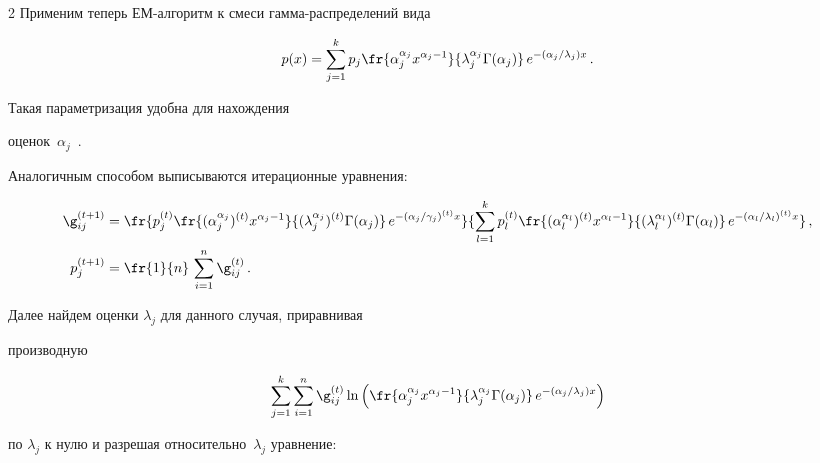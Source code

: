 \begin{multicols}{2}
Применим теперь ЕМ-алгоритм к смеси гам\-ма-рас\-пре\-де\-ле\-ний вида


$$


p(x) = \sum\limits_{j=1}^k p_j \fr{\alpha_j^{\alpha_j} x^{\alpha_j -


1}}{\lambda_j^{\alpha_j} \Gamma (\alpha_j )}\,e^{-(\alpha_j / \lambda_j)x}\,.


$$





Такая параметризация удобна для нахождения


оценок~$\alpha_j$~\cite{6bat}.





Аналогичным способом выписываются итерационные уравнения:


\begin{align*}


\g_{ij}^{(t+1)} & =   \fr{p_j^{(t)}\fr{(\alpha_j^{\alpha_j} )^{(t)}


x^{\alpha_j - 1}}{(\lambda_j^{\alpha_j} )^{(t)}\Gamma (\alpha_j)}\,


e^{-(\alpha_j /\gamma_j)^{(t)}x}}{\sum\limits_{l=1}^k


p_l^{(t)}\fr{(\alpha_l^{\alpha_l})^{(t)} x^{\alpha_l -


1}}{(\lambda_l^{\alpha_l})^{(t)}\Gamma (\alpha_l )}\,


e^{-(\alpha_l /\lambda_l)^{(t)} x}}\,,\\


p_j^{(t+1)} & = \fr{1}{n}\,\sum\limits_{i=1}^n \g_{ij}^{(t)}\,.


\end{align*}





Далее найдем оценки $\lambda_j$ для данного случая, приравнивая


производную


\begin{equation} %


\sum\limits_{j=1}^k \sum\limits_{i=1}^n \g_{ij}^{(t)} \ln \left (


\fr{\alpha_j^{\alpha_j} x^{\alpha_j -1}}{\lambda_j^{\alpha_j}\Gamma


(\alpha_j)}\,e^{-(\alpha_j /\lambda_j) x}\right )


\end{equation}


по $\lambda_j$ к нулю и разрешая относительно~$\lambda_j$ уравнение:



\end{multicols}
